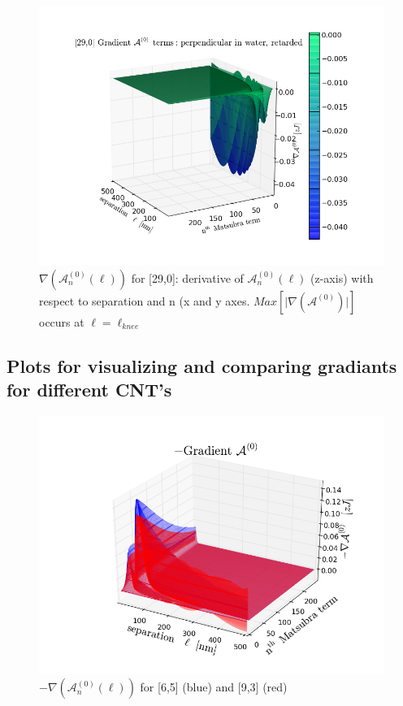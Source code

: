 \documentclass[a4paper]{article}
\begin{document}
\begin{center}
\begin{figure}[t!]
\begin{center}
\includegraphics[width=1.4\textwidth]{plots/grad_A0_290.png}
\hskip 43pt
\caption{$\nabla(\mathcal{A}_{n}^{(0)}(\ell))$ for [29,0]: derivative of
$\mathcal{A}_{n}^{(0)}(\ell)$ (z-axis) with respect to separation and n (x and
y axes. $Max[\lvert \nabla(\mathcal{A}^{(0)}) \rvert]$ occurs at
$\ell=\ell_{knee}$}
\label{eiz65}
\end{center}
\end{figure} 


\subsection{Plots for visualizing and comparing gradiants for different CNT's}%
\begin{figure}[t!]
\begin{center}
\includegraphics[width=1.2\textwidth]{plots/A0_wire2_0.png}
\hskip 43pt
\caption{$-\nabla(\mathcal{A}_{n}^{(0)}(\ell))$ for [6,5] (blue) and [9,3] (red)}
\label{eiz65}
\end{center}
\end{figure} 


\end{center}
\end{document}
